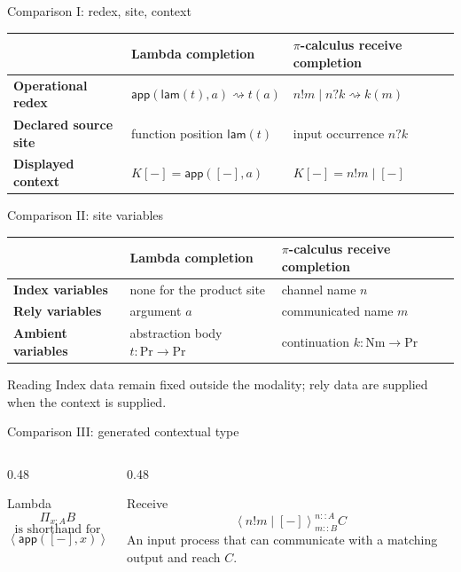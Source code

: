 \documentclass[aspectratio=169,11pt]{beamer}
\newcommand{\Proc}{\mathrm{Pr}}
\newcommand{\Nm}{\mathrm{Nm}}
\newcommand{\rw}{\rightsquigarrow}
\newcommand{\ty}{\mathrel{::}}
\newcommand{\app}{\mathsf{app}}
\newcommand{\lam}{\mathsf{lam}}
\newcommand{\hole}{[-]}
\newcommand{\Mod}[4]{\left\langle #1\right\rangle^{#2}_{#3} #4}
\begin{document}
\begin{frame}{Comparison I: redex, site, context}
\small
\begin{tabular}{>{\bfseries}p{}p{}p{}}
\toprule
 & Lambda completion & \(\pi\)-calculus receive completion \\
\midrule
Operational redex
& \(\app(\lam(t),a)\rw t(a)\)
& \(n!m\mid n?k\rw k(m)\) \\
\addlinespace
Declared source site
& function position \(\lam(t)\)
& input occurrence \(n?k\) \\
\addlinespace
Displayed context
& \(K\hole=\app(\hole,a)\)
& \(K\hole=n!m\mid\hole\) \\
\bottomrule
\end{tabular}
\end{frame}

\begin{frame}{Comparison II: site variables}
\small
\begin{tabular}{>{\bfseries}p{}p{}p{}}
\toprule
 & Lambda completion & \(\pi\)-calculus receive completion \\
\midrule
Index variables
& none for the product site
& channel name \(n\) \\
\addlinespace
Rely variables
& argument \(a\)
& communicated name \(m\) \\
\addlinespace
Ambient variables
& abstraction body \(t:\Proc\to\Proc\)
& continuation \(k:\Nm\to\Proc\) \\
\bottomrule
\end{tabular}

\vspace{0.8em}
\begin{block}{Reading}
Index data remain fixed outside the modality; rely data are supplied when the context is supplied.
\end{block}
\end{frame}

\begin{frame}{Comparison III: generated contextual type}
\begin{columns}[T]
\begin{column}{0.48\textwidth}
\begin{block}{Lambda}
\[
  \Pi_{x:A}B
\]
\vspace{-0.7em}
\[
  \text{is shorthand for}
\]
\[
  \Mod{\app(\hole,x)}{}{x\ty A}{B}
\]
\end{block}

\end{column}
\begin{column}{0.48\textwidth}
\begin{block}{Receive}
\[
  \Mod{n!m\mid\hole}{n\ty A}{m\ty B}{C}
\]
\vspace{0.3em}
An input process that can communicate with a matching output and reach \(C\).
\end{block}
\end{column}
\end{columns}
\end{frame}
\end{document}
